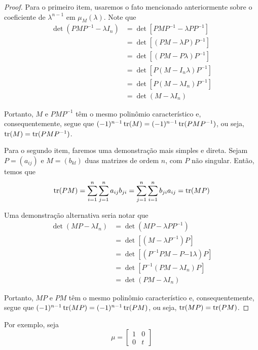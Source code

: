 	\begin{proof}
		Para o primeiro item, usaremos o fato mencionado anteriormente sobre o coeficiente de $\lambda^{n-1}$ em $\mu_M(\lambda)$. Note que 
		\begin{align*}
		\det( PMP^{-1} - \lambda I_n ) &= \det[ PMP^{-1} - \lambda PP^{-1} ] \\
		&= \det[ (PM - \lambda P)P^{-1} ] \\
		&= \det[ (PM - P\lambda)P^{-1} ] \\
		&= \det[ P(M - I_n\lambda)P^{-1} ] \\
		&= \det[ P(M - \lambda I_n)P^{-1} ] \\
		&= \det(M - \lambda I_n)
		\end{align*}
		\par\vspace{0.3cm} Portanto, $M$ e $PMP^{-1}$ têm o mesmo polinômio característico e, consequentemente, segue que $(-1)^{n-1}\operatorname{tr}(M) = (-1)^{n-1}\operatorname{tr}(PMP^{-1})$, ou seja, $\operatorname{tr}(M) = \operatorname{tr}(PMP^{-1})$.
		\par\vspace{0.3cm} Para o segundo item, faremos uma demonstração mais simples e direta. Sejam $P = (a_{ij})$ e $M = (b_{kl})$ duas matrizes de ordem $n$, com $P$ não singular. Então, temos que
		\begin{align*}
		\operatorname{tr}(PM) = \sum_{i=1}^{n}\sum_{j=1}^{n} a_{ij}b_{ji} = \sum_{j=1}^{n}\sum_{i=1}^{n} b_{ji}a_{ij} = \operatorname{tr}(MP)
		\end{align*}
		\par\vspace{0.3cm} Uma demonstração alternativa seria notar que
		\begin{align*}
		\det(MP - \lambda I_n) &= \det(MP - \lambda PP^{-1}) \\
		&= \det[ (M - \lambda P^{-1})P ] \\
		&= \det[ (P^{-1}PM - P{-1}\lambda)P ] \\
		&= \det[ P^{-1}(PM - \lambda I_n)P ] \\
		&= \det(PM - \lambda I_n)
		\end{align*}
		\par\vspace{0.3cm} Portanto, $MP$ e $PM$ têm o mesmo polinômio característico e, consequentemente, segue que $(-1)^{n-1}\operatorname{tr}(MP) = (-1)^{n-1}\operatorname{tr}(PM)$, ou seja, $\operatorname{tr}(MP) = \operatorname{tr}(PM)$.
	\end{proof}
	\par\vspace{0.3cm} Por exemplo, seja 
	\begin{equation}
	\label{parte 1 invariante Jones}
	\mu = \begin{bmatrix}
	1 & 0 \\
	0 & t
	\end{bmatrix}
	\end{equation}
